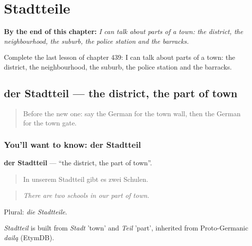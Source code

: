 
\chapter{Stadtteile}
\label{ch:ge-stadtteile}

\begin{chapteropening}
\textbf{By the end of this chapter:} \emph{I can talk about parts of a town: the district, the neighbourhood, the suburb, the police station and the barracks.}

Complete the last lesson of chapter 439: I can talk about parts of a town: the district, the neighbourhood, the suburb, the police station and the barracks.
\end{chapteropening}

\section[der Stadtteil]{der Stadtteil — the district, the part of town}

\label{lesson:GE-C439-stadtteil}



\begin{quote}
Before the new one: say the German for the town wall, then the German for the town gate.
\end{quote}

\subsection*{You'll want to know: der Stadtteil}
\textbf{der Stadtteil} — \textquotedblleft{}the district, the part of town\textquotedblright{}.

\begin{quote}
In unserem Stadtteil gibt es zwei Schulen.
\end{quote}

\begin{quote}
\emph{There are two schools in our part of town.}
\end{quote}

Plural: \emph{die Stadtteile}.

\begin{cousinweb}
\emph{Stadtteil} is built from \emph{Stadt} 'town' and \emph{Teil} 'part', inherited from Proto-Germanic \emph{dailą} (EtymDB).
\end{cousinweb}

